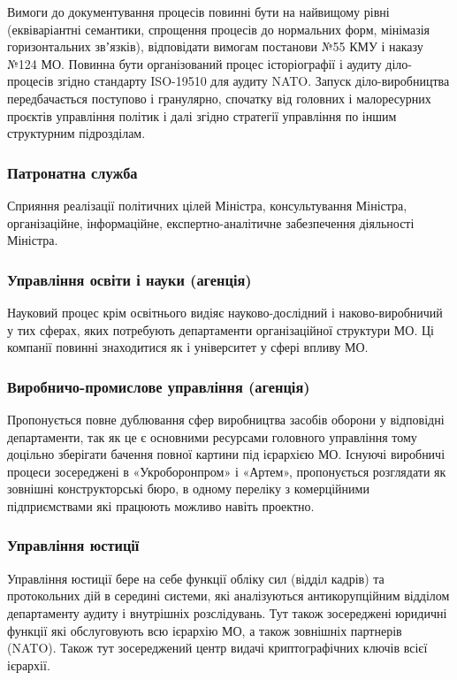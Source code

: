 Вимоги до документування процесів повинні бути на найвищому рівні (еквіваріантні
семантики, спрощення процесів до нормальних форм, мінімазія горизонтальних
звʼязків), відповідати вимогам постанови №55 КМУ і наказу №124 МО. Повинна
бути організований процес історіографії і аудиту діло-процесів згідно
стандарту ISO-19510 для аудиту NATO. Запуск діло-виробництва передбачається
поступово і гранулярно, спочатку від головних і малоресурних проєктів
управління політик і далі згідно стратегії управління по іншим структурним підрозділам.

\subsubsection{Патронатна служба}

Сприяння реалізації політичних цілей Міністра, консультування Міністра, організаційне, інформаційне, експертно-аналітичне забезпечення діяльності Міністра.

\subsubsection{Управління освіти і науки (агенція)}

Науковий процес крім освітнього видіяє науково-дослідний і наково-виробничий у тих сферах, яких потребують департаменти організаційної структури МО. Ці компанії повинні знаходитися як і університет у сфері впливу МО.

\subsubsection{Виробничо-промислове управління (агенція)}

Пропонується повне дублювання сфер виробництва засобів оборони у відповідні департаменти, так як це є основними ресурсами головного управління тому доцільно зберігати бачення повної картини під ієрархією МО. Існуючі виробничі процеси зосереджені в «Укроборонпром» і «Артем», пропонується розглядати як зовнішні конструкторські бюро, в одному переліку з комерційними підприємствами які працюють можливо навіть проектно.

\subsubsection{Управління юстиції}

Управління юстиції бере на себе функції обліку сил (відділ кадрів) та протокольних дій в середині системи, які аналізуються антикорупційним відділом департаменту аудиту і внутрішніх розслідувань. Тут також зосереджені юридичні функції які обслуговують всю ієрархію МО, а також зовнішніх партнерів (NATO). Також тут зосереджений центр видачі криптографічних ключів всієї ієрархії.

